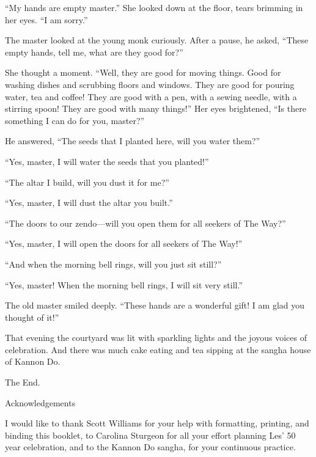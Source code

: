 \documentclass{book}
\renewcommand{\chapter}[1]{
  \cleardoublepage
  \vspace*{1in}
  {\par\noindent\raggedright \Large #1\par}
  \vspace*{.5in}
}
\begin{document}
``My hands are empty master.'' She looked down at the floor, tears brimming in
her eyes. ``I am sorry.'' 

The master looked at the young monk curiously. After a pause, he asked, ``These
empty hands, tell me, what are they good for?''

She thought a moment. ``Well, they are good for moving things. Good for washing
dishes and scrubbing floors and windows. They are good for pouring water, tea
and coffee! They are good with a pen, with a sewing needle, with a stirring
spoon! They are good with many things!'' Her eyes brightened, ``Is there
something I can do for you, master?''

He answered, ``The seeds that I planted here, will you water them?''

``Yes, master, I will water the seeds that you planted!''

``The altar I build, will you dust it for me?''

``Yes, master, I will dust the altar you built.''

``The doors to our zendo---will you open them for all seekers of The Way?''

``Yes, master, I will open the doors for all seekers of The Way!''

``And when the morning bell rings, will you just sit still?''

``Yes, master! When the morning bell rings, I will sit very still.''

The old master smiled deeply. ``These hands are a wonderful gift! I am glad you
thought of it!''

That evening the courtyard was lit with sparkling lights and the joyous voices
of celebration. And there was much cake eating and tea sipping at the sangha
house of Kannon Do.

The End.

\chapter{Acknowledgements}
I would like to thank Scott Williams for your help with formatting, printing,
and binding this booklet, to Carolina Sturgeon for all your effort planning
Les' 50 year celebration, and to the Kannon Do sangha, for your continuous
practice.
\end{document}
